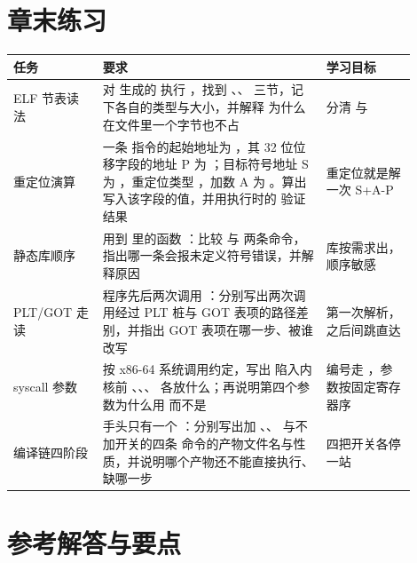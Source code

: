 \section*{章末练习}

\begin{longtable}{L{0.2\linewidth}L{0.5\linewidth}L{0.2\linewidth}}
\toprule
任务 & 要求 & 学习目标 \\
\midrule
ELF 节表读法 & 对  生成的  执行 ，找到 、、 三节，记下各自的类型与大小，并解释  为什么在文件里一个字节也不占 & 分清  与  \\
重定位演算 & 一条  指令的起始地址为 ，其 32 位位移字段的地址 P 为 ；目标符号地址 S 为 ，重定位类型 ，加数 A 为 。算出写入该字段的值，并用执行时的  验证结果 & 重定位就是解一次 S+A-P \\
静态库顺序 &  用到  里的函数 ：比较  与  两条命令，指出哪一条会报未定义符号错误，并解释原因 & 库按需求出，顺序敏感 \\
PLT/GOT 走读 & 程序先后两次调用 ：分别写出两次调用经过 PLT 桩与 GOT 表项的路径差别，并指出 GOT 表项在哪一步、被谁改写 & 第一次解析，之后间跳直达 \\
syscall 参数 & 按 x86-64 系统调用约定，写出  陷入内核前 、、、 各放什么；再说明第四个参数为什么用  而不是  & 编号走 ，参数按固定寄存器序 \\
编译链四阶段 & 手头只有一个 ：分别写出加 、、 与不加开关的四条  命令的产物文件名与性质，并说明哪个产物还不能直接执行、缺哪一步 & 四把开关各停一站 \\
\bottomrule
\end{longtable}

\section*{参考解答与要点}


